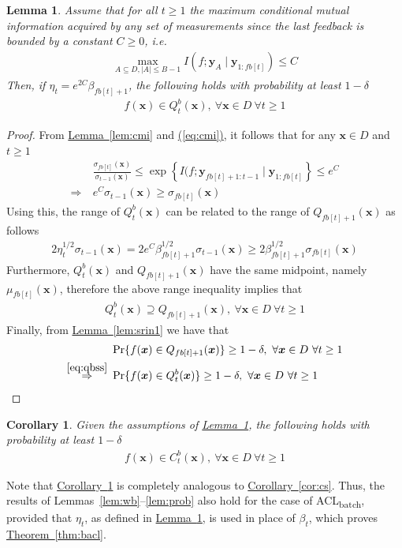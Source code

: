 \documentclass{article}
\def\*#1{\bm{#1}}
\newcommand{\theoremref}[1]{\hyperref[#1]{\mbox{Theorem~\ref*{#1}}}}
\newcommand{\lemmaref}[1]{\hyperref[#1]{\mbox{Lemma~\ref*{#1}}}}
\newcommand{\corref}[1]{\hyperref[#1]{\mbox{Corollary~\ref*{#1}}}}
\newcommand{\eqtref}[1]{\hyperref[#1]{\mbox{(\ref*{#1})}}}
\newtheorem{lemma}{Lemma}
\newtheorem{cor}{Corollary}
\newcommand{\bacl}{\textsf{ACL\textsubscript{batch}}\xspace}
\begin{document}
\begin{lemma}
\label{lem:batch}
Assume that for all $t \geq 1$ the maximum conditional mutual information
acquired by any set of measurements since the last feedback is bounded
by a constant $C \geq 0$, i.e.
\begin{align}
\label{eq:cmi}
\max_{A\subseteq D, |A|\leq B-1} I(f; \*y_A \mid \*y_{1:fb[t]}) \leq C
\end{align}
Then, if $\eta_t = e^{2C}\beta_{fb[t]+1}$, the following holds with probability
at least $1 - \delta$
\begin{align*}
f(\*x) \in Q_t^{b}(\*x),\ \forall \*x \in D\ \forall t \geq 1
\end{align*}
\end{lemma}
\begin{proof}
From \lemmaref{lem:cmi} and \eqtref{eq:cmi}, it follows that for any
$\*x \in D$ and $t \geq 1$
\begin{align*}
&\frac{\sigma_{fb[t]}(\*x)}{\sigma_{t-1}(\*x)} \leq \exp\left\{I(f; \*y_{fb[t]+1:t-1} \mid \*y_{1:fb[t]}\right\} \leq e^C\\
\Rightarrow\ & e^C \sigma_{t-1}(\*x) \geq \sigma_{fb[t]}(\*x)
\end{align*}
Using this, the range of $Q_t^{b}(\*x)$ can be related to the range
of $Q_{fb[t]+1}(\*x)$ as follows
\begin{align*}
2\eta_t^{1/2}\sigma_{t-1}(\*x) = 2 e^C \beta_{fb[t]+1}^{1/2}\sigma_{t-1}(\*x) \geq 2\beta_{fb[t]+1}^{1/2}\sigma_{fb[t]}(\*x)
\end{align*}
Furthermore, $Q_t^{b}(\*x)$ and $Q_{fb[t]+1}(\*x)$ have the same midpoint,
namely $\mu_{fb[t]}(\*x)$, therefore the above range inequality implies that
\begin{align}
\label{eq:qbss}
Q_t^{b}(\*x) \supseteq Q_{fb[t]+1}(\*x),\ \forall \*x \in D\ \forall t \geq 1
\end{align}
Finally, from \lemmaref{lem:srin1} we have that
\begin{align*}
&\Pr\{f(\*x) \in Q_{fb[t]+1}(\*x)\} \geq 1 - \delta,\ \forall \*x \in D\ \forall t \geq 1\\
\stackrel{\eqref{eq:qbss}}{\Rightarrow}\ & \Pr\{f(\*x) \in Q_t^{b}(\*x)\} \geq 1 - \delta,\ \forall \*x \in D\ \forall t \geq 1
\end{align*}
\end{proof}

\begin{cor}
\label{cor:batch}
Given the assumptions of \lemmaref{lem:batch}, the following holds with
probability at least $1-\delta$
\begin{align*}
f(\*x) \in C_t^{b}(\*x),\ \forall \*x \in D\ \forall t \geq 1
\end{align*}
\end{cor}

Note that \corref{cor:batch} is completely analogous to \corref{cor:cs}.
Thus, the results of Lemmas~\ref{lem:wb}--\ref{lem:prob} also hold for
the case of \bacl, provided that $\eta_t$, as defined in \lemmaref{lem:batch},
is used in place of $\beta_t$, which proves \theoremref{thm:bacl}.
\end{document}

